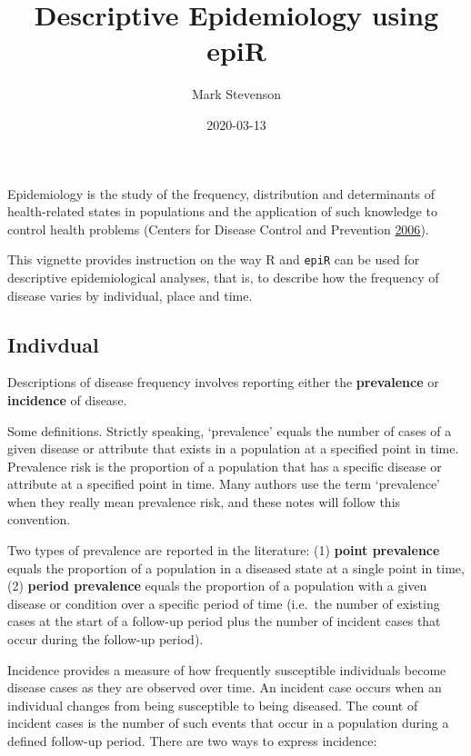 \documentclass[
]{article}
\title{Descriptive Epidemiology using epiR}
\author{Mark Stevenson}
\date{2020-03-13}
\begin{document}
\maketitle

\setmainfont{Calibri Light}

Epidemiology is the study of the frequency, distribution and
determinants of health-related states in populations and the application
of such knowledge to control health problems (Centers for Disease
Control and Prevention \protect\hyperlink{ref-cdc:2006}{2006}).

This vignette provides instruction on the way R and \texttt{epiR} can be
used for descriptive epidemiological analyses, that is, to describe how
the frequency of disease varies by individual, place and time.

\hypertarget{indivdual}{%
\subsection{Indivdual}\label{indivdual}}

Descriptions of disease frequency involves reporting either the
\textbf{prevalence} or \textbf{incidence} of disease.

Some definitions. Strictly speaking, `prevalence' equals the number of
cases of a given disease or attribute that exists in a population at a
specified point in time. Prevalence risk is the proportion of a
population that has a specific disease or attribute at a specified point
in time. Many authors use the term `prevalence' when they really mean
prevalence risk, and these notes will follow this convention.

Two types of prevalence are reported in the literature: (1)
\textbf{point prevalence} equals the proportion of a population in a
diseased state at a single point in time, (2) \textbf{period prevalence}
equals the proportion of a population with a given disease or condition
over a specific period of time (i.e.~the number of existing cases at the
start of a follow-up period plus the number of incident cases that occur
during the follow-up period).

Incidence provides a measure of how frequently susceptible individuals
become disease cases as they are observed over time. An incident case
occurs when an individual changes from being susceptible to being
diseased. The count of incident cases is the number of such events that
occur in a population during a defined follow-up period. There are two
ways to express incidence:
\end{document}
